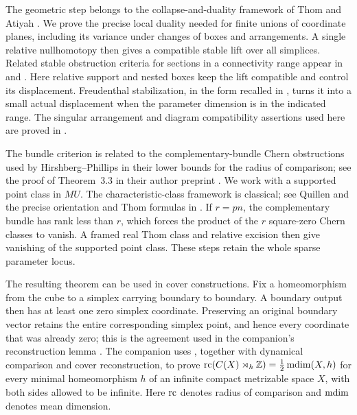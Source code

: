 The geometric step belongs to the collapse-and-duality framework of
Thom and Atiyah \cite{Thom1954,Atiyah1961Thom}.  We prove the precise
local duality needed for finite unions of coordinate planes, including
its variance under changes of boxes and arrangements.  A single
relative nullhomotopy then gives a compatible stable lift over all
simplices.  Related stable obstruction criteria for sections in a
connectivity range appear in
\cite[Theorems~4.2--4.3]{Larmore1972} and
\cite[Corollary~3.5]{KleinWilliams2007}.  Here relative support and
nested boxes keep the lift compatible and control its displacement.
Freudenthal stabilization, in the form recalled in
\cite[Corollary~4.24]{Hatcher2002}, turns it into a small actual
displacement when the parameter dimension is in the indicated range.
The singular arrangement and diagram compatibility assertions used
here are proved in .

The bundle criterion is related to the complementary-bundle Chern
obstructions used by Hirshberg--Phillips in their lower bounds for the
radius of comparison; see the proof of Theorem~3.3 in their author
preprint \cite{HirshbergPhillips2022}.  We work
with a supported point class in $MU$.  The characteristic-class
framework is classical; see Quillen \cite{Quillen1971Cobordism} and
the precise orientation and Thom formulas in
\cite[Lectures~5--6]{Lurie2010}.  If $r=pn$, the complementary bundle
has rank less than $r$, which forces the product of the $r$ square-zero
Chern classes to vanish.  A framed real Thom class and relative
excision then give vanishing of the supported point class.  These
steps retain the whole sparse parameter locus.

The resulting theorem can be used in cover constructions.  Fix a
homeomorphism from the cube to a simplex carrying boundary to boundary.
A boundary output then has at least one zero simplex coordinate.
Preserving an original boundary vector retains the entire corresponding
simplex point, and hence every coordinate that was already zero; this
is the agreement used in the companion's reconstruction lemma
\cite[Lemma~4.3]{OpenAIRadiusMeanDimension2026}.
The companion \cite[Theorem~1.1]{OpenAIRadiusMeanDimension2026}
uses , together with dynamical comparison
and cover reconstruction, to prove
$\operatorname{rc}(C(X)\rtimes_h\mathbb Z)=\tfrac12\operatorname{mdim}(X,h)$ for every minimal
homeomorphism $h$ of an infinite compact metrizable space $X$,
with both sides allowed to be infinite.
Here $\operatorname{rc}$ denotes radius of comparison and $\operatorname{mdim}$ denotes mean dimension.

